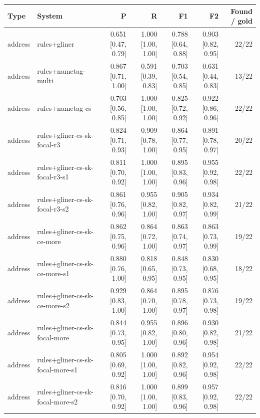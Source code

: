 \providecommand{\ci}[2]{{\scriptsize [#1, #2]}}

\begin{table}[htbp]
\centering
\small
\begin{tabular}{llrrrrr}
\toprule
Type & System & P & R & F1 & F2 & Found / gold \\
\midrule
address & rules+gliner & 0.651 \ci{0.47}{0.79} & 1.000 \ci{1.00}{1.00} & 0.788 \ci{0.64}{0.88} & 0.903 \ci{0.82}{0.95} & 22/22 \\
address & rules+nametag-multi & 0.867 \ci{0.71}{1.00} & 0.591 \ci{0.39}{0.83} & 0.703 \ci{0.54}{0.85} & 0.631 \ci{0.44}{0.83} & 13/22 \\
address & rules+nametag-cs & 0.703 \ci{0.56}{0.85} & 1.000 \ci{1.00}{1.00} & 0.825 \ci{0.72}{0.92} & 0.922 \ci{0.86}{0.96} & 22/22 \\
address & rules+gliner-cs-sk-focal-r3 & 0.824 \ci{0.71}{0.93} & 0.909 \ci{0.78}{1.00} & 0.864 \ci{0.77}{0.95} & 0.891 \ci{0.78}{0.97} & 20/22 \\
address & rules+gliner-cs-sk-focal-r3-s1 & 0.811 \ci{0.70}{0.92} & 1.000 \ci{1.00}{1.00} & 0.895 \ci{0.83}{0.96} & 0.955 \ci{0.92}{0.98} & 22/22 \\
address & rules+gliner-cs-sk-focal-r3-s2 & 0.861 \ci{0.76}{0.96} & 0.955 \ci{0.82}{1.00} & 0.905 \ci{0.82}{0.97} & 0.934 \ci{0.82}{0.99} & 21/22 \\
address & rules+gliner-cs-sk-ce-more & 0.862 \ci{0.75}{0.96} & 0.864 \ci{0.72}{1.00} & 0.863 \ci{0.74}{0.97} & 0.863 \ci{0.73}{0.99} & 19/22 \\
address & rules+gliner-cs-sk-ce-more-s1 & 0.880 \ci{0.76}{1.00} & 0.818 \ci{0.65}{0.95} & 0.848 \ci{0.73}{0.95} & 0.830 \ci{0.68}{0.95} & 18/22 \\
address & rules+gliner-cs-sk-ce-more-s2 & 0.929 \ci{0.83}{1.00} & 0.864 \ci{0.70}{1.00} & 0.895 \ci{0.78}{0.97} & 0.876 \ci{0.73}{0.98} & 19/22 \\
address & rules+gliner-cs-sk-focal-more & 0.844 \ci{0.73}{0.95} & 0.955 \ci{0.82}{1.00} & 0.896 \ci{0.80}{0.96} & 0.930 \ci{0.82}{0.98} & 21/22 \\
address & rules+gliner-cs-sk-focal-more-s1 & 0.805 \ci{0.69}{0.92} & 1.000 \ci{1.00}{1.00} & 0.892 \ci{0.82}{0.96} & 0.954 \ci{0.92}{0.98} & 22/22 \\
address & rules+gliner-cs-sk-focal-more-s2 & 0.816 \ci{0.70}{0.92} & 1.000 \ci{1.00}{1.00} & 0.899 \ci{0.83}{0.96} & 0.957 \ci{0.92}{0.98} & 22/22 \\

\end{tabular}
\end{table}
